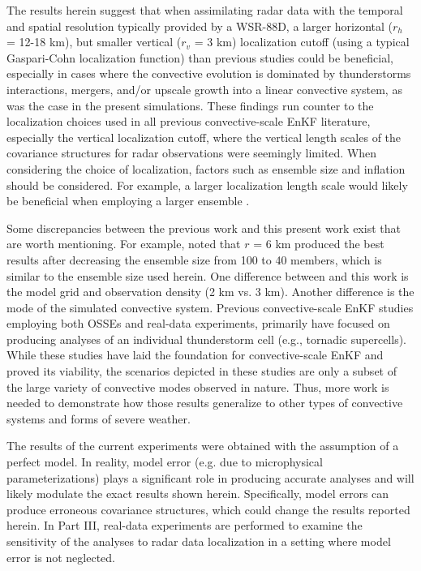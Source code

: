 The results herein suggest that when assimilating radar data with the temporal and spatial resolution typically provided by a WSR-88D, a larger horizontal (\(r_h\) = 12-18 km), but smaller vertical (\(r_v\) = 3 km) localization cutoff (using a typical Gaspari-Cohn localization function) than previous studies could be beneficial, especially in cases where the convective evolution is dominated by thunderstorms interactions, mergers, and/or upscale growth into a linear convective system, as was the case in the present simulations. These findings run counter to the localization choices used in all previous convective-scale EnKF literature, especially the vertical localization cutoff, where the vertical length scales of the covariance structures for radar observations were seemingly limited. When considering the choice of localization, factors such as ensemble size and inflation should be considered. For example, a larger localization length scale would likely be beneficial when employing a larger ensemble \citep{houtekamermitchell98}.

Some discrepancies between the previous work and this present work exist that are worth mentioning. For example, \citet{tongxue05} noted that \(r\) = 6 km produced the best results after decreasing the ensemble size from 100 to 40 members, which is similar to the ensemble size used herein. One difference between \citet{tongxue05} and this work is the model grid and observation density (2 km vs. 3 km). Another difference is the mode of the simulated convective system. Previous convective-scale EnKF studies employing both OSSEs and real-data experiments, primarily have focused on producing analyses of an individual thunderstorm cell (e.g., tornadic supercells). While these studies have laid the foundation for convective-scale EnKF and proved its viability, the scenarios depicted in these studies are only a subset of the large variety of convective modes observed in nature. Thus, more work is needed to demonstrate how those results generalize to other types of convective systems and forms of severe weather.

The results of the current experiments were obtained with the assumption of a perfect model. In reality, model error (e.g. due to microphysical parameterizations) plays a significant role in producing accurate analyses and will likely modulate the exact results shown herein. Specifically, model errors can produce erroneous covariance structures, which could change the results reported herein. In Part III, real-data experiments are performed to examine the sensitivity of the analyses to radar data localization in a setting where model error is not neglected.

